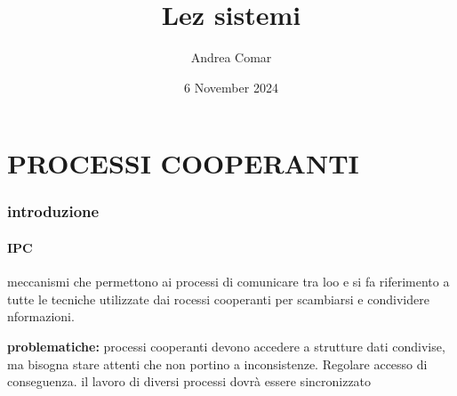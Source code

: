 \documentclass{article}
\title{Lez sistemi}
\author{Andrea Comar}
\date{6 November 2024}
\begin{document}
\maketitle
\part{PROCESSI COOPERANTI}
\section{introduzione}
\subsection{IPC}
meccanismi che permettono ai processi di comunicare tra loo e si fa riferimento a tutte le tecniche utilizzate dai rocessi cooperanti per scambiarsi e condividere nformazioni.

\textbf{problematiche:} processi cooperanti devono accedere a strutture dati condivise, ma bisogna stare attenti che non portino a inconsistenze. Regolare accesso di conseguenza.
il lavoro di diversi processi dovrà essere sincronizzato
\end{document}
